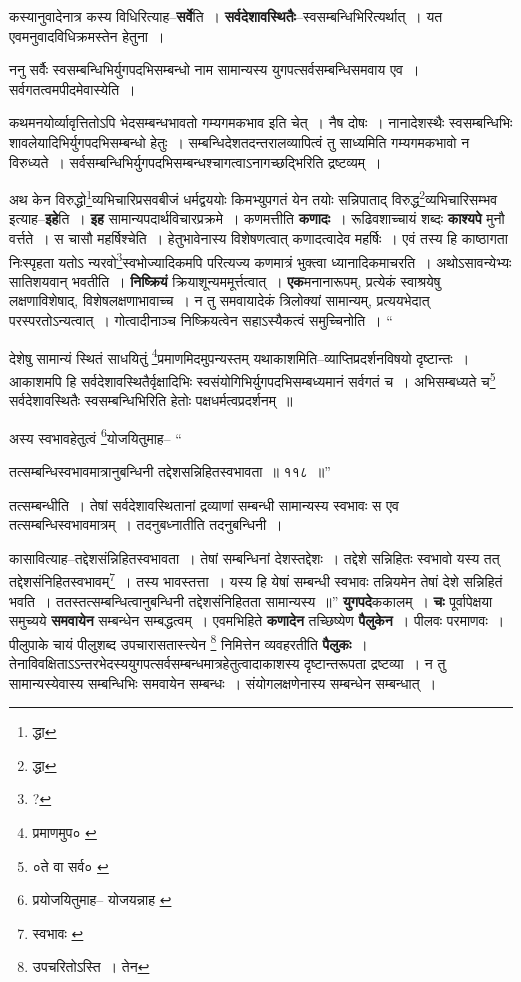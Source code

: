 \documentclass[article,12pt,a4paper]{memoir}
\begin{document}
	  \pstart कस्यानुवादेनात्र कस्य विधिरित्या\leavevmode{}ह--\textbf{सर्वे}ति । \textbf{सर्वदेशावस्थितैः}--स्वसम्बन्धिभिरित्यर्थात् । यत एवमनुवादविधिक्रमस्तेन हेतुना ।
	\pend
      

	  \pstart ननु सर्वैः स्वसम्बन्धिभिर्युगपदभिसम्बन्धो नाम सामान्यस्य युगपत्सर्वसम्बन्धिसमवाय एव । सर्वगतत्वमपीदमेवास्येति ।
	\pend
      

	  \pstart कथमनयोर्व्यावृत्तितोऽपि भेदसम्बन्धभावतो गम्यगमकभाव इति चेत् । नैष दोषः । नानादेशस्थैः स्वसम्बन्धिभिः शावलेयादिभिर्युगपदभिसम्बन्धो हेतुः । सम्बन्धिदेशतदन्तरालव्यापित्वं तु साध्यमिति गम्यगमकभावो न विरुध्यते । सर्वसम्बन्धिभिर्युगपदभिसम्बन्धश्चागत्वाऽनागच्छद्भिरिति द्रष्टव्यम् ।
	\pend
      

	  \pstart अथ केन विरुद्धो\footnote{द्धा}व्यभिचारिप्रसवबीजं धर्मद्वययोः किमभ्युपगतं येन तयोः सन्निपाताद् विरुद्ध\footnote{द्धा}व्यभिचारिसम्भव इत्याह--\textbf{इहे}ति । \textbf{इह} सामान्यपदार्थविचारप्रक्रमे । कणमत्तीति \textbf{कणादः} । रूढिवशाच्चायं शब्दः \textbf{काश्यपे} मुनौ वर्त्तते । स चासौ महर्षिश्चेति । हेतुभावेनास्य विशेषणत्वात् कणादत्वादेव महर्षिः । एवं तस्य हि काष्ठागता निःस्पृहता यतोऽ न्यरवो\footnote{?}स्वभोज्यादिकमपि परित्यज्य कणमात्रं भुक्त्वा ध्यानादिकमाचरति । अथोऽसावन्येभ्यः सातिशयवान् भवतीति । \textbf{निष्क्रियं} क्रियाशून्यममूर्त्तत्वात् । \textbf{एक}मनानारूपम्, प्रत्येकं स्वाश्रयेषु लक्षणाविशेषाद्, विशेषलक्षणाभावाच्च । न तु समवायादेकं त्रिलोक्यां सामान्यम्, प्रत्ययभेदात् परस्परतोऽन्यत्वात् । गोत्वादीनाञ्च निष्क्रियत्वेन सहाऽस्यैकत्वं समुच्चिनोति ।  \leavevmode{} “
	  
	देशेषु सामान्यं स्थितं साधयितुं \footnote{प्रमाणमुप० \cite{dp-msC}}प्रमाणमिदमुपन्यस्तम् यथाकाशमिति--व्याप्तिप्रदर्शनविषयो दृष्टान्तः । आकाशमपि हि सर्वदेशावस्थितैर्वृक्षादिभिः स्वसंयोगिभिर्युगपदभिसम्बध्यमानं सर्वगतं च । अभिसम्बध्यते च\footnote{०ते वा सर्व० \cite{dp-msB}} सर्वदेशावस्थितैः स्वसम्बन्धिभिरिति हेतोः पक्षधर्मत्वप्रदर्शनम् ॥ 
	  
	अस्य स्वभावहेतुत्वं \footnote{प्रयोजयितुमाह--\cite{dp-msA} \cite{dp-msB} \cite{dp-edP} \cite{dp-edH} \cite{dp-edN} योजयन्नाह \cite{dp-edE}}योजयितुमाह-- “
	  
	तत्सम्बन्धिस्वभावमात्रानुबन्धिनी तद्देशसन्निहितस्वभावता ॥ ११८ ॥” 
	  
	तत्सम्बन्धीति । तेषां सर्वदेशावस्थितानां द्रव्याणां सम्बन्धी सामान्यस्य स्वभावः स एव तत्सम्बन्धिस्वभावमात्रम् । तदनुबध्नातीति तदनुबन्धिनी । 
	  
	कासावित्याह--तद्देशसंन्निहितस्वभावता । तेषां सम्बन्धिनां देशस्तद्देशः । तद्देशे सन्निहितः स्वभावो यस्य तत् तद्देशसंनिहितस्वभावम्\footnote{स्वभावः \cite{dp-msC} \cite{dp-msD} \cite{dp-edE}} । तस्य भावस्तत्ता । यस्य हि येषां सम्बन्धी स्वभावः तन्नियमेन तेषां देशे सन्निहितं भवति । ततस्तत्सम्बन्धित्वानुबन्धिनी तद्देशसंनिहितता सामान्यस्य ॥” \textbf{युगपदे}ककालम् । \textbf{चः} पूर्वापेक्षया समुच्यये \textbf{समवायेन} सम्बन्धेन सम्बद्धत्वम् । एवमभिहिते \textbf{कणादेन} तच्छिष्येण \textbf{पैलुकेन} । पीलवः परमाणवः । पीलुपाके चायं पीलुशब्द उपचारासतास्त्त्येन \footnote{उपचरितोऽस्ति । तेन} निमित्तेन व्यवहरतीति \textbf{पैलुकः} । तेनाविवक्षिताऽऽन्तरभेदस्ययुगपत्सर्वसम्बन्धमात्रहेतुत्वादाकाशस्य दृष्टान्तरूपता द्रष्टव्या । न तु सामान्यस्येवास्य सम्बन्धिभिः समवायेन सम्बन्धः । संयोगलक्षणेनास्य सम्बन्धेन सम्बन्धात् ।
	\pend
      
\end{document}

